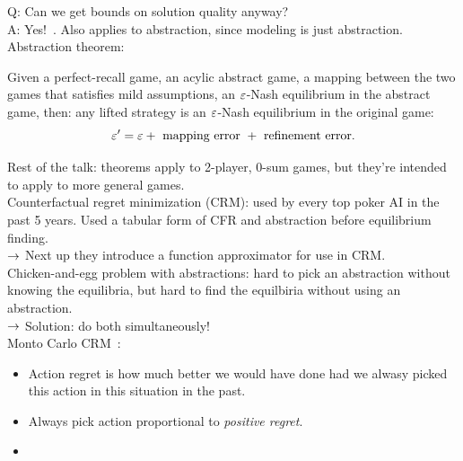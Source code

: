 Q: Can we get bounds on solution quality anyway?  \\

A: Yes!~\cite{sandholm2012lossy}. Also applies to abstraction, since modeling is just abstraction. \\

Abstraction theorem:
\begin{theorem}
Given a perfect-recall game, an acylic abstract game, a mapping between the two games that satisfies mild assumptions, an $\varepsilon$-Nash equilibrium in the abstract game, then: any lifted strategy is an $\varepsilon$-Nash equilibrium in the original game:
\[
\varepsilon' = \varepsilon + \text{ mapping error } + \text{ refinement error.}
\]
\end{theorem}

Rest of the talk: theorems apply to 2-player, 0-sum games, but they're intended to apply to more general games. \\

Counterfactual regret minimization (CRM): used by every top poker AI in the past 5 years. Used a tabular form of CFR and abstraction before equilibrium finding. \\

$\rightarrow$ Next up they introduce a function approximator for use in CRM. \\

Chicken-and-egg problem with abstractions: hard to pick an abstraction without knowing the equilibria, but hard to find the equilbiria without using an abstraction. \\

$\rightarrow$ Solution: do both simultaneously! \\

Monto Carlo CRM~\cite{lanctot2009monte}:
\begin{itemize}
    \item Action regret is how much better we would have done had we alwasy picked this action in this situation in the past.
    \item Always pick action proportional to {\it positive regret}.
    \item 
\end{itemize}